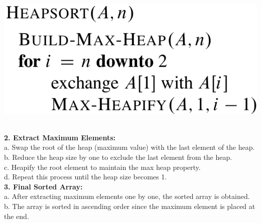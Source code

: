 \documentclass[5pt]{extarticle}
\begin{document}
\begin{minipage}[t]{0.49\textwidth}
{{\begin{minipage}[htp]{0.43\textwidth}
\begin{center}
            \includegraphics[width=0.9\linewidth]{images/heapsort.png}
        \end{center}
    \end{minipage}\\
    
    \textbf{2. Extract Maximum Elements:}\\
    a. Swap the root of the heap (maximum value) with the last element of the heap.\\
    b. Reduce the heap size by one to exclude the last element from the heap.\\
    c. Heapify the root element to maintain the max heap property.\\
    d. Repeat this process until the heap size becomes 1.\\

    \textbf{3. Final Sorted Array:}\\
    a. After extracting maximum elements one by one, the sorted array is obtained.\\
    b. The array is sorted in ascending order since the maximum element is placed at the end.
    
}}
\end{minipage}
\end{document}
